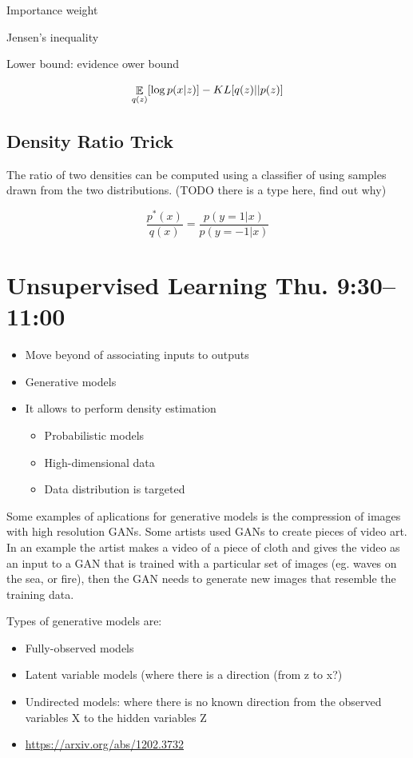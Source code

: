 \documentclass[b5paper]{report}
\begin{document}
Importance weight

Jensen's inequality

Lower bound: evidence ower bound

\begin{equation}
  \operatorname*{\mathbb{\mathop{E}}}_{q(z)} [\log p(x|z)] - KL[q(z) || p(z)]
\end{equation}

\subsection{Density Ratio Trick}

The ratio of two densities can be computed using a classifier of using samples
drawn from the two distributions. (TODO there is a type here, find out why)

\begin{equation}
  \frac{p^*(x)}{q(x)} = \frac{p(y=1|x)}{p(y=-1|x)}
\end{equation}

\section{Unsupervised Learning Thu. 9:30--11:00}

\begin{itemize}
  \item Move beyond of associating inputs to outputs
  \item Generative models
  \item It allows to perform density estimation
    \begin{itemize}
      \item Probabilistic models
      \item High-dimensional data
      \item Data distribution is targeted
    \end{itemize}
\end{itemize}


Some examples of aplications for generative models is the compression of images
with high resolution GANs. Some artists used GANs to create pieces of video
art. In an example the artist makes a video of a piece of cloth and gives the
video as an input to a GAN that is trained with a particular set of images (eg.
waves on the sea, or fire), then the GAN needs to generate new images that
resemble the training data.

Types of generative models are:

\begin{itemize}
  \item Fully-observed models
  \item Latent variable models (where there is a direction (from z to x?)
  \item Undirected models: where there is no known direction from the
    observed variables X to the hidden variables Z
  \item \href{Sum-product networks}{https://arxiv.org/abs/1202.3732}
\end{itemize}
\end{document}
